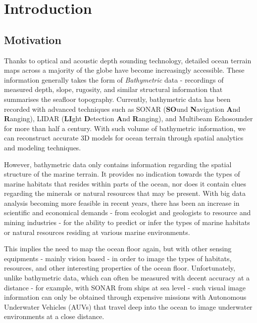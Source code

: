 \chapter{Introduction}
\label{Introduction}

	\section{Motivation}
	
		Thanks to optical and acoustic depth sounding technology, detailed ocean terrain maps across a majority of the globe have become increasingly accessible. These information generally takes the form of \textit{Bathymetric} data - recordings of measured depth, slope, rugosity, and similar structural information that summarises the seafloor topography. Currently, bathymetric data has been recorded with advanced techniques such as SONAR (\textbf{SO}und \textbf{N}avigation \textbf{A}nd \textbf{R}anging), LIDAR (\textbf{LI}ght \textbf{D}etection \textbf{A}nd \textbf{R}anging), and Multibeam Echosounder for more than half a century. With such volume of bathymetric information, we can reconstruct accurate 3D models for ocean terrain through spatial analytics and modeling techniques.
		
		However, bathymetric data only contains information regarding the spatial structure of the marine terrain. It provides no indication towards the types of marine habitats that resides within parts of the ocean, nor does it contain clues regarding the minerals or natural resources that may be present. With big data analysis becoming more feasible in recent years, there has been an increase in scientific and economical demands - from ecologist and geologists to resource and mining industries - for the ability to predict or infer the types of marine habitats or natural resources residing at various marine environments.
		
		This implies the need to map the ocean floor again, but with other sensing equipments - mainly vision based - in order to image the types of habitats, resources, and other interesting properties of the ocean floor. Unfortunately, unlike bathymetric data, which can often be measured with decent accuracy at a distance - for example, with SONAR from ships at sea level - such visual image information can only be obtained through expensive missions with Autonomous Underwater Vehicles (AUVs) that travel deep into the ocean to image underwater environments at a close distance.
		
